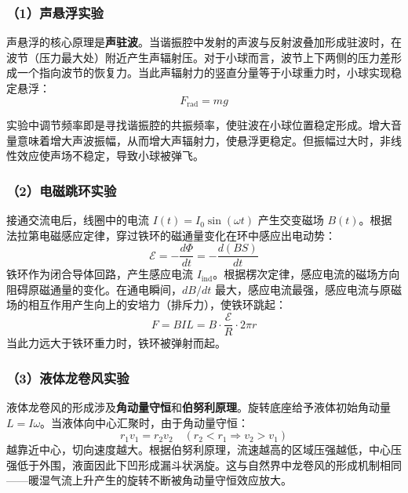 \documentclass[a4paper,12pt]{article}
\begin{document}
\subsubsection{（1）声悬浮实验}

声悬浮的核心原理是\textbf{声驻波}。当谐振腔中发射的声波与反射波叠加形成驻波时，在波节（压力最大处）附近产生声辐射压。对于小球而言，波节上下两侧的压力差形成一个指向波节的恢复力。当此声辐射力的竖直分量等于小球重力时，小球实现稳定悬浮：
\begin{equation}
    F_{\text{rad}} = mg
\end{equation}

实验中调节频率即是寻找谐振腔的共振频率，使驻波在小球位置稳定形成。增大音量意味着增大声波振幅，从而增大声辐射力，使悬浮更稳定。但振幅过大时，非线性效应使声场不稳定，导致小球被弹飞。

\subsubsection{（2）电磁跳环实验}

接通交流电后，线圈中的电流 $I(t) = I_0 \sin(\omega t)$ 产生交变磁场 $B(t)$。根据法拉第电磁感应定律，穿过铁环的磁通量变化在环中感应出电动势：
\begin{equation}
    \mathcal{E} = -\frac{d\Phi}{dt} = -\frac{d(BS)}{dt}
\end{equation}
铁环作为闭合导体回路，产生感应电流 $I_{\text{ind}}$。根据楞次定律，感应电流的磁场方向阻碍原磁通量的变化。在通电瞬间，$dB/dt$ 最大，感应电流最强，感应电流与原磁场的相互作用产生向上的安培力（排斥力），使铁环跳起：
\begin{equation}
    F = BIL = B \cdot \frac{\mathcal{E}}{R} \cdot 2\pi r
\end{equation}
当此力远大于铁环重力时，铁环被弹射而起。

\subsubsection{（3）液体龙卷风实验}

液体龙卷风的形成涉及\textbf{角动量守恒}和\textbf{伯努利原理}。旋转底座给予液体初始角动量 $L = I\omega$。当液体向中心汇聚时，由于角动量守恒：
\begin{equation}
    r_1 v_1 = r_2 v_2 \quad (r_2 < r_1 \Rightarrow v_2 > v_1)
\end{equation}
越靠近中心，切向速度越大。根据伯努利原理，流速越高的区域压强越低，中心压强低于外围，液面因此下凹形成漏斗状涡旋。这与自然界中龙卷风的形成机制相同——暖湿气流上升产生的旋转不断被角动量守恒效应放大。
\end{document}
